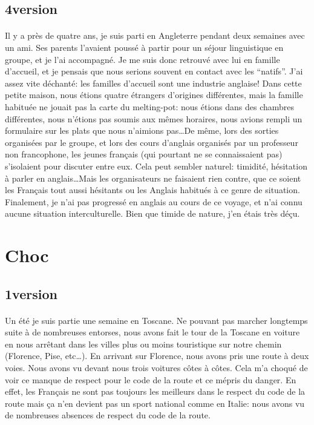 \subsection{4\ieme version}

\paragraph{} Il y a près de quatre ans, je suis parti en Angleterre pendant
deux semaines avec un ami. Ses parents l'avaient poussé à partir pour un séjour
linguistique en groupe, et je l'ai accompagné. Je me suis donc retrouvé avec
lui en famille d'accueil, et je pensais que nous serions souvent en contact
avec les ``natifs''. J'ai assez vite déchanté: les familles d'accueil sont une
industrie anglaise! Dans cette petite maison, nous étions quatre étrangers
d'origines différentes, mais la famille habituée ne jouait pas la carte du
melting-pot: nous étions dans des chambres différentes, nous n'étions pas
soumis aux mêmes horaires, nous avions rempli un formulaire sur les plats que
nous n'aimions pas\ldots De même, lors des sorties organisées par le groupe, et
lors des cours d'anglais organisés par un professeur non francophone, les
jeunes français (qui pourtant ne se connaissaient pas) s'isolaient pour
discuter entre eux. Cela peut sembler naturel: timidité, hésitation à parler en
anglais\ldots Mais les organisateurs ne faisaient rien contre, que ce soient
les Français tout aussi hésitants ou les Anglais habitués à ce genre de
situation. Finalement, je n'ai pas progressé en anglais au cours de ce voyage,
et n'ai connu aucune situation interculturelle. Bien que timide de nature, j'en
étais très déçu.

\section{Choc}

\subsection{1\iere version}

\paragraph{} Un été je suis partie une semaine en Toscane. Ne pouvant pas
marcher longtemps suite à de nombreuses entorses, nous avons fait le tour de la
Toscane en voiture en nous arrêtant dans les villes plus ou moins touristique
sur notre chemin (Florence, Pise, etc\ldots).  En arrivant sur Florence, nous avons
pris une route à deux voies. Nous avons vu devant nous trois voitures côtes à
côtes.  Cela m'a choqué de voir ce manque de respect pour le code de la route
et ce mépris du danger. En effet, les Français ne sont pas toujours les
meilleurs dans le respect du code de la route mais ça n'en devient pas un sport
national comme en Italie: nous avons vu de nombreuses absences de respect du
code de la route.


